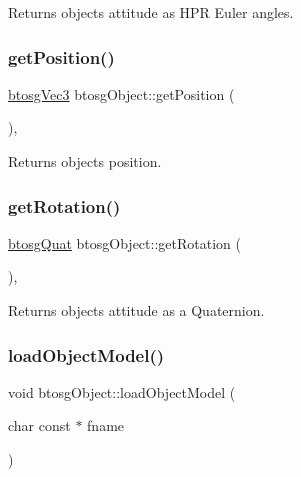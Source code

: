 Returns object\textquotesingle{}s attitude as H\+PR Euler angles. \mbox{\label{classbtosgObject_a3dadd5da8f2a312e44a039446b93d4cd}} 
\subsubsection{\texorpdfstring{getPosition()}{getPosition()}}
{\footnotesize\ttfamily \mbox{\hyperlink{classbtosgVec3}{btosg\+Vec3}} btosg\+Object\+::get\+Position (\begin{DoxyParamCaption}{ }\end{DoxyParamCaption})\hspace{0.3cm}{\ttfamily [inline]}, {\ttfamily [inherited]}}

Returns object\textquotesingle{}s position. \mbox{\label{classbtosgObject_a3b825999ad3a51bde743d4085ff19dae}} 
\subsubsection{\texorpdfstring{getRotation()}{getRotation()}}
{\footnotesize\ttfamily \mbox{\hyperlink{classbtosgQuat}{btosg\+Quat}} btosg\+Object\+::get\+Rotation (\begin{DoxyParamCaption}{ }\end{DoxyParamCaption})\hspace{0.3cm}{\ttfamily [inline]}, {\ttfamily [inherited]}}

Returns object\textquotesingle{}s attitude as a Quaternion. \mbox{\label{classbtosgObject_a91838b8235579da178fcc06e6d3d47f3}} 
\subsubsection{\texorpdfstring{loadObjectModel()}{loadObjectModel()}}
{\footnotesize\ttfamily void btosg\+Object\+::load\+Object\+Model (\begin{DoxyParamCaption}\item[{char const $\ast$}]{fname }\end{DoxyParamCaption})\hspace{0.3cm}{\ttfamily [inherited]}}

